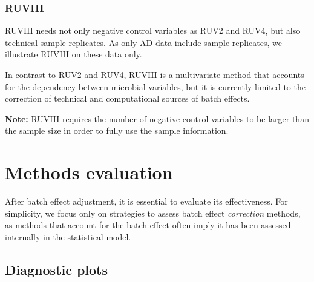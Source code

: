 \documentclass[]{book}
\newenvironment{Shaded}{\begin{snugshade}}{\end{snugshade}}
\newcommand{\KeywordTok}[1]{\textcolor[rgb]{0.13,0.29,0.53}{\textbf{#1}}}
\newcommand{\DataTypeTok}[1]{\textcolor[rgb]{0.13,0.29,0.53}{#1}}
\newcommand{\StringTok}[1]{\textcolor[rgb]{0.31,0.60,0.02}{#1}}
\newcommand{\CommentTok}[1]{\textcolor[rgb]{0.56,0.35,0.01}{\textit{#1}}}
\newcommand{\OperatorTok}[1]{\textcolor[rgb]{0.81,0.36,0.00}{\textbf{#1}}}
\newcommand{\NormalTok}[1]{#1}
\begin{document}
\subsection{RUVIII}\label{ruviii}

RUVIII needs not only negative control variables as RUV2 and RUV4, but
also technical sample replicates. As only AD data include sample
replicates, we illustrate RUVIII on these data only.

In contrast to RUV2 and RUV4, RUVIII is a multivariate method that
accounts for the dependency between microbial variables, but it is
currently limited to the correction of technical and computational
sources of batch effects.

\textbf{Note:} RUVIII requires the number of negative control variables
to be larger than the sample size in order to fully use the sample
information.

\begin{Shaded}
\end{Shaded}

\chapter{Methods evaluation}\label{eval}

After batch effect adjustment, it is essential to evaluate its
effectiveness. For simplicity, we focus only on strategies to assess
batch effect \emph{correction} methods, as methods that account for the
batch effect often imply it has been assessed internally in the
statistical model.

\section{Diagnostic plots}\label{diagnostic-plots}
\end{document}
